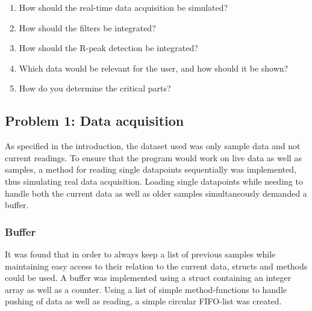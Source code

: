 \documentclass[12pt,a4paper]{article}
\begin{document}
 	\begin{enumerate}
	\item How should the real-time data acquisition be simulated?
	\item How should the filters be integrated?
	\item How should the R-peak detection be integrated?
	\item Which data would be relevant for the user, and how should it be shown?
	\item How do you determine the critical parts?
\end{enumerate}

\subsection{Problem 1: Data acquisition}
	As specified in the introduction, the dataset used was only sample data and not current readings. To ensure that the program would work on live data as well as samples, a method for reading single datapoints sequentially was implemented, thus simulating real data acquisition. Loading single datapoints while needing to handle both the current data as well as older samples simultaneously demanded a buffer. \\
	
\subsubsection{Buffer}
It was found that in order to always keep a list of previous samples while maintaining easy access to their relation to the current data, structs and methods could be used. A buffer was implemented using a struct containing an integer array as well as a counter. Using a list of simple method-functions to handle pushing of data as well as reading, a simple circular FIFO-list was created.
\end{document}
